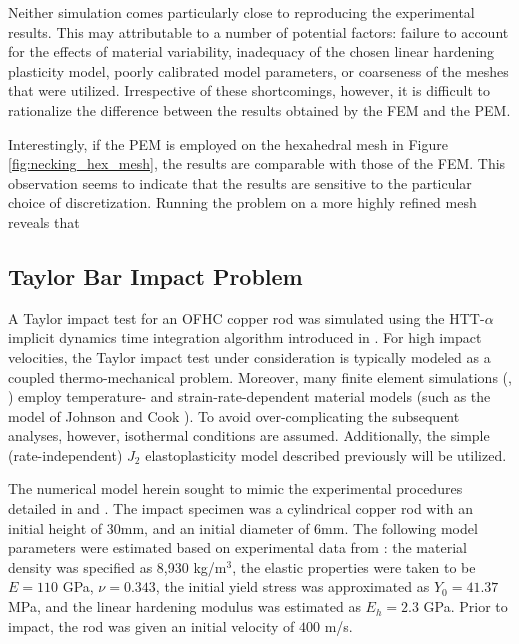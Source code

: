 Neither simulation comes particularly close to reproducing the experimental results. This may attributable to a number of potential factors: failure to account for the effects of material variability, inadequacy of the chosen linear hardening plasticity model, poorly calibrated model parameters, or coarseness of the meshes that were utilized. Irrespective of these shortcomings, however, it is difficult to rationalize the difference between the results obtained by the FEM and the PEM. 

Interestingly, if the PEM is employed on the hexahedral mesh in Figure \ref{fig:necking_hex_mesh}, the results are comparable with those of the FEM. This observation seems to indicate that the results are sensitive to the particular choice of discretization. Running the problem on a more highly refined mesh reveals that

\subsection*{Taylor Bar Impact Problem}

A Taylor impact test for an OFHC copper rod was simulated using the HTT-$\alpha$ implicit dynamics time integration algorithm introduced in \cite{Hilber&Hughes&Taylor:77}. For high impact velocities, the Taylor impact test under consideration is typically modeled as a coupled thermo-mechanical problem. Moreover, many finite element simulations (\cite{Heinstein:05}, \cite{Banerjee:05}) employ temperature- and strain-rate-dependent material models (such as the model of Johnson and Cook \cite{Johnson&Cook:83}). To avoid over-complicating the subsequent analyses, however, isothermal conditions are assumed. Additionally, the simple (rate-independent) $J_2$ elastoplasticity model described previously will be utilized.

The numerical model herein sought to mimic the experimental procedures detailed in \cite{Johnson&Cook:83} and \cite{Gust:82}. The impact specimen was a cylindrical copper rod with an initial height of 30mm, and an initial diameter of 6mm. The following model parameters were estimated based on experimental data from \cite{Hecker:73}: the material density was specified as 8,930 kg/$\text{m}^3$, the elastic properties were taken to be $E = 110$ GPa, $\nu = 0.343$, the initial yield stress was approximated as $Y_0 = 41.37$ MPa, and the linear hardening modulus was estimated as $E_h = 2.3$ GPa. Prior to impact, the rod was given an initial velocity of $400$ m/s.

